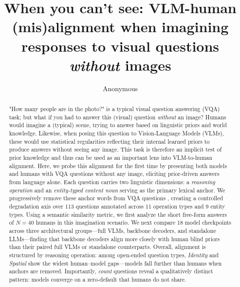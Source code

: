 \documentclass[letterpaper]{article}
\title{When you can't see: VLM-human (mis)alignment when imagining responses to visual questions \emph{without} images}
\author{Anonymous}
\begin{document}
\maketitle

\begin{abstract}

"How many people are in the photo?" is a typical visual question answering (VQA) task; but what if you had to answer this (visual) question \emph{without} an image? Humans would imagine a (typical) scene, trying to answer based on linguistic priors and world knowledge. Likewise, when posing this question to Vision-Language Models (VLMs), these would use statistical regularities reflecting their internal learned priors to produce answers without seeing any image. This task is therefore an implicit test of prior knowledge and thus can be used as an important lens into VLM-to-human alignment.   
Here, we probe this alignment for the first time by presenting both models and humans with VQA questions without any image, eliciting prior-driven answers from language alone. Each question carries two linguistic dimensions: a \emph{reasoning operation} and an \emph{entity-typed content noun} serving as the primary lexical anchor. We progressively remove these anchor words from VQA questions%
, creating a controlled degradation axis over 113 questions annotated across 11 operation types and 9 entity types.
Using a semantic similarity metric, we first analyze the short free-form answers of $N=40$ humans in this imagination scenario. We next compare 18 model checkpoints across three architectural groups---full VLMs, backbone decoders, and standalone LLMs---finding that backbone decoders align more closely with human blind priors than their paired full VLMs or standalone counterparts.
Overall, alignment is structured by reasoning operation: among open-ended question types, \textit{Identity} and \textit{Spatial} show the widest human--model gaps---models fall further than humans when anchors are removed. Importantly, \textit{count} questions reveal a qualitatively distinct pattern: models converge on a zero-default that humans do not share.
\end{abstract}
\end{document}
